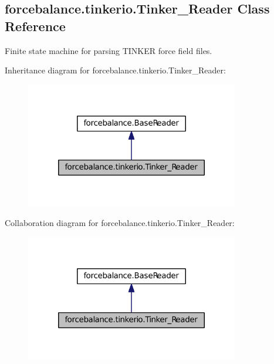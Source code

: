 \hypertarget{classforcebalance_1_1tinkerio_1_1Tinker__Reader}{\subsection{forcebalance.\-tinkerio.\-Tinker\-\_\-\-Reader \-Class \-Reference}
\label{classforcebalance_1_1tinkerio_1_1Tinker__Reader}
}


\-Finite state machine for parsing \-T\-I\-N\-K\-E\-R force field files.  




\-Inheritance diagram for forcebalance.\-tinkerio.\-Tinker\-\_\-\-Reader\-:
\nopagebreak
\begin{figure}[H]
\begin{center}
\leavevmode
\includegraphics[width=264pt]{classforcebalance_1_1tinkerio_1_1Tinker__Reader__inherit__graph}
\end{center}
\end{figure}


\-Collaboration diagram for forcebalance.\-tinkerio.\-Tinker\-\_\-\-Reader\-:
\nopagebreak
\begin{figure}[H]
\begin{center}
\leavevmode
\includegraphics[width=264pt]{classforcebalance_1_1tinkerio_1_1Tinker__Reader__coll__graph}
\end{center}
\end{figure}
